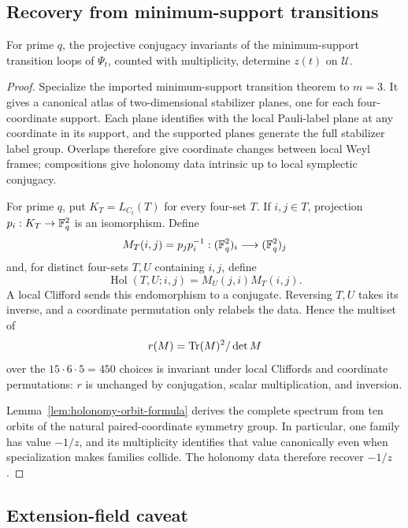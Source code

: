 \subsection{Recovery from minimum-support transitions}

\begin{proposition}
\label{prop:pencil-holonomy-recovery}
For prime \(q\), the projective conjugacy invariants of the
minimum-support transition loops of \(\Psi_t\), counted with multiplicity,
determine \(z(t)\) on \(\mathcal U\).
\end{proposition}

\begin{proof}
Specialize the imported minimum-support transition theorem to \(m=3\).  It
gives a canonical atlas of two-dimensional stabilizer planes, one for each
four-coordinate support.  Each plane identifies with the local Pauli-label
plane at any coordinate in its support, and the supported planes generate the
full stabilizer label group.  Overlaps therefore give coordinate changes
between local Weyl frames; compositions give holonomy data intrinsic up to
local symplectic conjugacy.

For prime \(q\), put \(K_T=L_{C_t}(T)\) for every four-set \(T\).  If
\(i,j\in T\), projection \(p_i:K_T\to\mathbb F_q^2\) is an isomorphism.  Define
\[
 M_T(i,j)=p_jp_i^{-1}:(\mathbb F_q^2)_i\longrightarrow(\mathbb F_q^2)_j
\]
and, for distinct four-sets \(T,U\) containing \(i,j\), define
\begin{equation}\label{eq:minimum-support-holonomy}
 \operatorname{Hol}(T,U;i,j)=M_U(j,i)M_T(i,j).
\end{equation}
A local Clifford sends this endomorphism to a conjugate.  Reversing \(T,U\)
takes its inverse, and a coordinate permutation only relabels the data.
Hence the multiset of
\[
 r(M)=\operatorname{Tr}(M)^2/\det M
\]
over the \(15\cdot6\cdot5=450\) choices is invariant under local Cliffords
and coordinate permutations: \(r\) is unchanged by conjugation, scalar
multiplication, and inversion.

Lemma~\ref{lem:holonomy-orbit-formula} derives the complete spectrum from ten
orbits of the natural paired-coordinate symmetry group.  In particular, one
family has value \(-1/z\), and its multiplicity identifies that value
canonically even when specialization makes families collide.  The holonomy
data therefore recover \(-1/z\).
\end{proof}

\subsection{Extension-field caveat}

